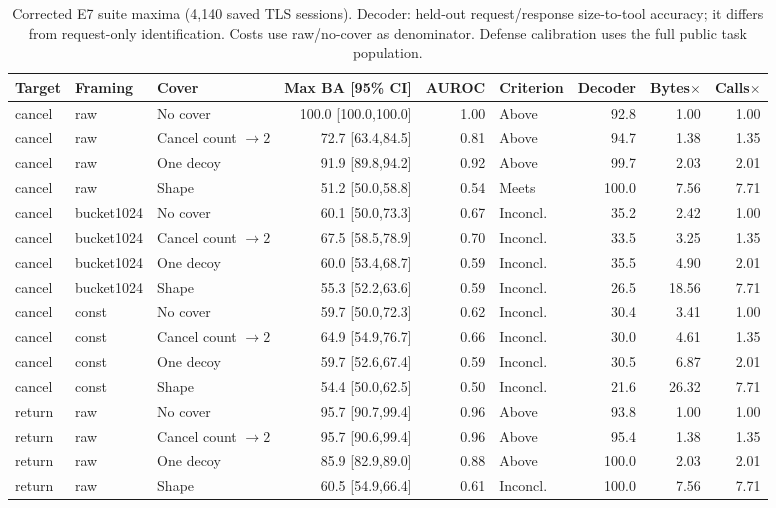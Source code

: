 \begin{table}[!ht]\centering\scriptsize
\caption{Corrected E7 suite maxima (4,140 saved TLS sessions). Decoder: held-out request/response size-to-tool accuracy; it differs from request-only identification. Costs use raw/no-cover as denominator. Defense calibration uses the full public task population.}
\begin{tabular}{@{}lllrrlrrr@{}}\toprule
Target & Framing & Cover & Max BA [95\% CI] & AUROC & Criterion & Decoder & Bytes$\times$ & Calls$\times$\\\midrule
cancel & raw & No cover & 100.0 [100.0,100.0] & 1.00 & Above & 92.8 & 1.00 & 1.00\\
cancel & raw & Cancel count $\to2$ & 72.7 [63.4,84.5] & 0.81 & Above & 94.7 & 1.38 & 1.35\\
cancel & raw & One decoy & 91.9 [89.8,94.2] & 0.92 & Above & 99.7 & 2.03 & 2.01\\
cancel & raw & Shape & 51.2 [50.0,58.8] & 0.54 & Meets & 100.0 & 7.56 & 7.71\\
cancel & bucket1024 & No cover & 60.1 [50.0,73.3] & 0.67 & Inconcl. & 35.2 & 2.42 & 1.00\\
cancel & bucket1024 & Cancel count $\to2$ & 67.5 [58.5,78.9] & 0.70 & Inconcl. & 33.5 & 3.25 & 1.35\\
cancel & bucket1024 & One decoy & 60.0 [53.4,68.7] & 0.59 & Inconcl. & 35.5 & 4.90 & 2.01\\
cancel & bucket1024 & Shape & 55.3 [52.2,63.6] & 0.59 & Inconcl. & 26.5 & 18.56 & 7.71\\
cancel & const & No cover & 59.7 [50.0,72.3] & 0.62 & Inconcl. & 30.4 & 3.41 & 1.00\\
cancel & const & Cancel count $\to2$ & 64.9 [54.9,76.7] & 0.66 & Inconcl. & 30.0 & 4.61 & 1.35\\
cancel & const & One decoy & 59.7 [52.6,67.4] & 0.59 & Inconcl. & 30.5 & 6.87 & 2.01\\
cancel & const & Shape & 54.4 [50.0,62.5] & 0.50 & Inconcl. & 21.6 & 26.32 & 7.71\\
return & raw & No cover & 95.7 [90.7,99.4] & 0.96 & Above & 93.8 & 1.00 & 1.00\\
return & raw & Cancel count $\to2$ & 95.7 [90.6,99.4] & 0.96 & Above & 95.4 & 1.38 & 1.35\\
return & raw & One decoy & 85.9 [82.9,89.0] & 0.88 & Above & 100.0 & 2.03 & 2.01\\
return & raw & Shape & 60.5 [54.9,66.4] & 0.61 & Inconcl. & 100.0 & 7.56 & 7.71\\

\end{tabular}
\end{table}
